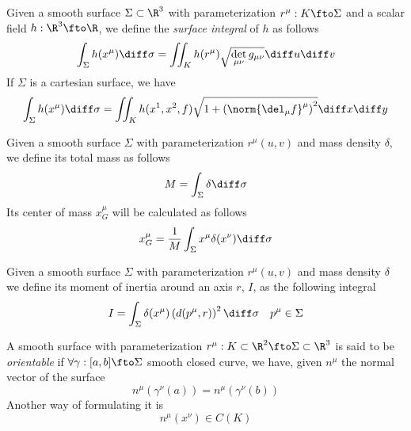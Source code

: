 \documentclass[../mmf.tex]{subfiles}
\begin{document}
\begin{dfn}
	Given a smooth surface $\Sigma\subset\R^3$ with parameterization $r^\mu:K\fto\Sigma$ and a scalar field $h:\R^3\fto\R$, we define the \textit{surface integral} of $h$ as follows
	\begin{equation}
		\int_\Sigma h(x^\mu)\diff\sigma=\iint_Kh(r^\mu)\sqrt{\det_{\mu\nu}g_{\mu\nu}}\diff u\diff v
		\label{eq:surfaceint}
	\end{equation}
	If $\Sigma$ is a cartesian surface, we have
	\begin{equation}
		\int_{\Sigma}^{}h(x^\mu)\diff\sigma=\iint_Kh(x^1,x^2,f)\sqrt{1+\left( \norm{\del_\mu f}^\mu \right)^2}\diff x\diff y
		\label{eq:cartesiansurfaceint}
	\end{equation}
\end{dfn}
\begin{dfn}
	Given a smooth surface $\Sigma$ with parameterization $r^\mu(u,v)$ and mass density $\delta$, we define its total mass as follows
	\begin{equation}
		M=\int_\Sigma\delta\diff\sigma
		\label{eq:totalmasssurf}
	\end{equation}
	Its center of mass $x_G^\mu$ will be calculated as follows
	\begin{equation}
		x_G^\mu=\frac{1}{M}\int_\Sigma x^\mu\delta(x^\nu)\diff\sigma
		\label{eq:centerofmasssurf}
	\end{equation}
\end{dfn}
\begin{dfn}
	Given a smooth surface $\Sigma$ with parameterization $r^\mu(u,v)$ and mass density $\delta$ we define its moment of inertia around an axis $r$, $I$, as the following integral
	\begin{equation}
		I=\int_\Sigma\delta(x^\mu)\left( d(p^\mu,r) \right)^2\diff\sigma\quad p^\mu\in\Sigma
		\label{eq:momentofinertia}
	\end{equation}
\end{dfn}
\begin{dfn}
	A smooth surface with parameterization $r^\mu:K\subset\R^2\fto\Sigma\subset\R^3$ is said to be \textit{orientable} if $\forall\gamma:[a,b]\fto\Sigma$ smooth closed curve, we have, given $n^\mu$ the normal vector of the surface
	\begin{equation}
		n^\mu(\gamma^\nu(a))=n^\mu(\gamma^\nu(b))
		\label{eq:orientabilitysurf}
	\end{equation}
	Another way of formulating it is
	\begin{equation}
		n^\mu(x^\nu)\in C(K)
		\label{eq:orientability2}
	\end{equation}
\end{dfn}
\end{document}
